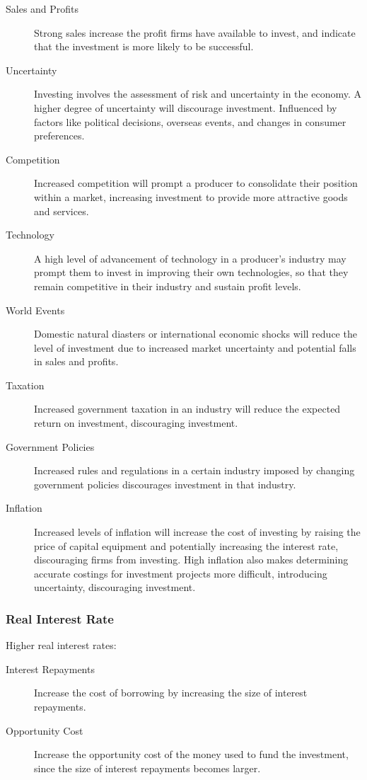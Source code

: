 \documentclass[a4paper,11pt]{article}
\begin{document}
\begin{description}
\item [Sales and Profits] Strong sales increase the profit firms have available
	to invest, and indicate that the investment is more likely to be successful.
\item [Uncertainty] Investing involves the assessment of risk and uncertainty
	in the economy. A higher degree of uncertainty will discourage investment.
	Influenced by factors like political decisions, overseas events, and
	changes in consumer preferences.
\item [Competition] Increased competition will prompt a producer to consolidate
	their position within a market, increasing investment to provide more
	attractive goods and services.
\item [Technology] A high level of advancement of technology in a producer's
	industry may prompt them to invest in improving their own technologies, so
	that they remain competitive in their industry and sustain profit levels.
\item [World Events] Domestic natural diasters or international economic shocks
	will reduce the level of investment due to increased market uncertainty
	and potential falls in sales and profits.
\item [Taxation] Increased government taxation in an industry will reduce the
	expected return on investment, discouraging investment.
\item [Government Policies] Increased rules and regulations in a certain
	industry imposed by changing government policies discourages investment in
	that industry.
\item [Inflation] Increased levels of inflation will increase the cost of
	investing by raising the price of capital equipment and potentially
	increasing the interest rate, discouraging firms from investing. High
	inflation also makes determining accurate costings for investment projects
	more difficult, introducing uncertainty, discouraging investment.
\end{description}


\subsubsection{Real Interest Rate}

Higher real interest rates:

\begin{description}
\item [Interest Repayments] Increase the cost of borrowing by increasing the
	size of interest repayments.
\item [Opportunity Cost] Increase the opportunity cost of the money used to
	fund the investment, since the size of interest repayments becomes larger.
\end{description}
\end{document}
